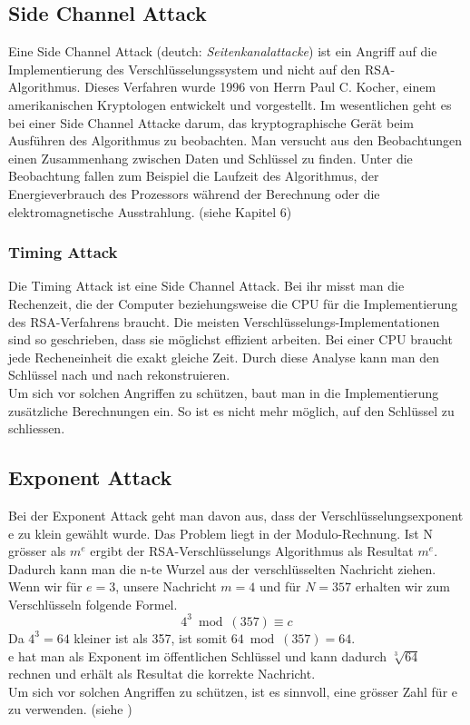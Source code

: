 %
\subsection{Side Channel Attack}
Eine Side Channel Attack (deutch: \textit{Seitenkanalattacke}) ist ein Angriff auf die Implementierung des Verschlüsselungssystem und nicht auf den RSA-Algorithmus. Dieses Verfahren wurde 1996 von Herrn Paul C. Kocher, einem amerikanischen Kryptologen entwickelt und vorgestellt.
Im wesentlichen geht es bei einer Side Channel Attacke darum, das kryptographische Gerät beim Ausführen des Algorithmus zu beobachten.
Man versucht aus den Beobachtungen einen Zusammenhang zwischen Daten und Schlüssel zu finden.
Unter die Beobachtung fallen zum Beispiel die Laufzeit des Algorithmus, der Energieverbrauch des Prozessors während der Berechnung oder die elektromagnetische Ausstrahlung. (siehe \cite{rsa_and_public_key} Kapitel 6)
%
\subsubsection{Timing Attack}
Die Timing Attack ist eine Side Channel Attack. 
Bei ihr misst man die Rechenzeit, die der Computer beziehungsweise die CPU für die Implementierung des RSA-Verfahrens braucht. Die meisten Verschlüsselungs-Implementationen sind so geschrieben, dass sie möglichst effizient arbeiten. Bei einer CPU braucht jede Recheneinheit die exakt gleiche Zeit. Durch diese Analyse kann man den Schlüssel nach und nach rekonstruieren.\\
%
Um sich vor solchen Angriffen zu schützen, baut man in die Implementierung zusätzliche Berechnungen ein. So ist es nicht mehr möglich, auf den Schlüssel zu schliessen.
%
%
\subsection{Exponent Attack}
Bei der Exponent Attack geht man davon aus, dass der Verschlüsselungsexponent e zu klein gewählt wurde. Das Problem liegt in der Modulo-Rechnung. Ist N grösser als $m^e$ ergibt der RSA-Verschlüsselungs Algorithmus als Resultat $m^e$. Dadurch kann man die n-te Wurzel aus der verschlüsselten Nachricht ziehen. \\
Wenn wir für $e = 3$, unsere Nachricht $m = 4$ und für $N = 357$ erhalten wir zum Verschlüsseln folgende Formel.
\begin{equation*}
  4^3 \bmod(357) \equiv c
\end{equation*}
Da $4^3 = 64$ kleiner ist als 357, ist somit $64 \bmod(357) = 64$.\\
e hat man als Exponent im öffentlichen Schlüssel und kann dadurch $\sqrt[3]{64}$ rechnen und erhält als Resultat die korrekte Nachricht.\\
%
Um sich vor solchen Angriffen zu schützen, ist es sinnvoll, eine grösser Zahl für e zu verwenden. (siehe \cite{exponent_Attack} )
